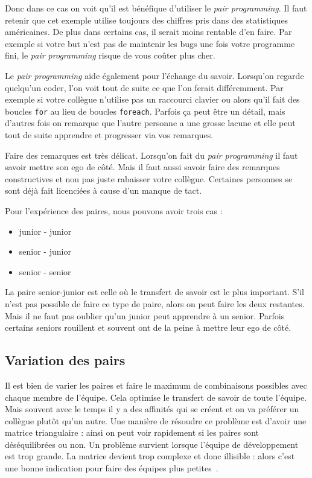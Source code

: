 \documentclass[journal, a4paper, frenchb]{IEEEtran}
\begin{document}
Donc dans ce cas on voit qu’il est bénéfique d’utiliser le \emph{pair programming}. Il faut retenir que cet exemple utilise toujours des chiffres pris dans des statistiques américaines. De plus dans certains cas, il serait moins rentable d'en faire. Par exemple si votre but n’est pas de maintenir les bugs une fois votre programme fini, le \emph{pair programming} risque de vous coûter plus cher.

Le \emph{pair programming} aide également pour l’échange du savoir. Lorsqu’on regarde quelqu’un coder, l'on voit tout de suite ce que l'on ferait différemment. Par exemple si votre collègue n’utilise pas un raccourci clavier ou alors qu’il fait des boucles \texttt{for} au lieu de boucles \texttt{foreach}. Parfois ça peut être un détail, mais d’autres fois on remarque que l’autre personne a une grosse lacune et elle peut tout de suite apprendre et progresser via vos remarques.

Faire des remarques est très délicat. Lorsqu’on fait du \emph{pair programming} il faut savoir mettre son ego de côté. Mais il faut aussi savoir faire des remarques constructives et non pas juste rabaisser votre collègue. Certaines personnes se sont déjà fait licenciées à cause d'un manque de tact.

Pour l’expérience des paires, nous pouvons avoir trois cas :

\begin{itemize}
  \item junior - junior
  \item senior - junior
  \item senior - senior
\end{itemize}

La paire senior-junior est celle où le transfert de savoir est le plus important. S’il n’est pas possible de faire ce type de paire, alors on peut faire les deux restantes. Mais il ne faut pas oublier qu’un junior peut apprendre à un senior. Parfois certains seniors rouillent et souvent ont de la peine à mettre leur ego de côté.

\subsection{Variation des pairs}

Il est bien de varier les paires et faire le maximum de combinaisons possibles avec chaque membre de l’équipe. Cela optimise le transfert de savoir de toute l’équipe. Mais souvent avec le temps il y a des affinités qui se créent et on va préférer un collègue plutôt qu’un autre. Une manière de résoudre ce problème est d’avoir une matrice triangulaire : ainsi on peut voir rapidement si les paires sont déséquilibrées ou non. Un problème survient lorsque l’équipe de développement est trop grande. La matrice devient trop complexe et donc illisible : alors c’est une bonne indication pour faire des équipes plus petites~\cite{PPMatrix}.
\end{document}
